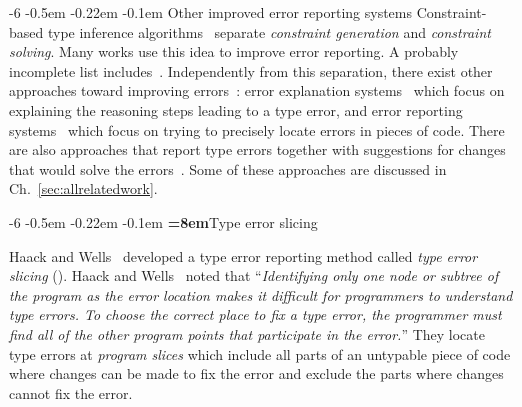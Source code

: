 \documentclass{jfp1}
\makeatletter
\def\subsection{\@startsection{subsection}{2}{\z@}{-0.2\baselineskip plus -0.1\baselineskip minus -0.1\baselineskip}%
    {-0.5em \@plus -0.22em \@minus -0.1em}{\normalfont\normalsize\bfseries}}%
\def\subsubsection{\@startsection{subsubsection}{3}{\z@}{-0.2\baselineskip plus -0.1\baselineskip minus -0.1\baselineskip}%
    {-0.5em \@plus -0.22em \@minus -0.1em}{\normalfont\normalsize\bfseries}}%
\newcommand{\sectiontitledot}[1]{#1.}
\renewcommand\subsection{\@startsection{subsection}{2}{\z@}%
                            {-6\p@ \@plus -1\p@ \@minus -1\p@}%
                            {-0.5em \@plus -0.22em \@minus -0.1em}%
                            {\normalfont\normalsize\bfseries\boldmath
                             \rightskip=\z@ \@plus 8em\pretolerance=10000\sectiontitledot}}
\renewcommand\subsubsection{\@startsection{subsubsection}{3}{\z@}%
                            {-6\p@ \@plus -1\p@ \@minus -1\p@}%
                            {-0.5em \@plus -0.22em \@minus -0.1em}%
                            {\normalfont\normalsize\bfseries\boldmath\sectiontitledot}}
\makeatother
\begin{document}
\subsubsection{Other improved error reporting systems}
%
Constraint-based type inference
algorithms~\cite{Odersky+Sulzmann+Wehr:1999,Pottier:2005,Pottier+Remy:2005}
separate \emph{constraint generation} and \emph{constraint solving}.
Many works use this idea to improve error reporting.  A probably
incomplete list
includes~\cite{Haack+Wells:2003,Haack+Wells:2004,Gast:2004,Heeren+Jeuring+Swierstra+Alcocer:2002,Heeren+Hage+Swierstra:2003a,Hage+Heeren:2005a,Heeren:2005,Hage+Heeren:2009,Stuckey+Sulzmann+Wazny:2003,Stuckey+Sulzmann+Wazny:2004,Stuckey+Sulzmann+Wazny:2006}.
%
Independently from this separation, there exist
other approaches toward improving
errors~\cite{Yang+Wells+Trinder+Michaelson:2000}: error explanation
systems~\cite{Beaven+Stansifer:1993,Duggan+Bent:1996,Duggan:1998,Yang+Michaelson+Trinder:2002}
which focus on explaining the reasoning steps leading to a type error,
and error reporting systems~\cite{Wand:1986,Tip+Dinesh:2001} which
focus on trying to precisely locate errors in pieces of code.
%
%
There are also approaches that report type errors together with
suggestions for changes that would solve the
errors~\cite{Hage+Heeren:2006,Chambers+Grossman+Flower+Lerner:2007}.
%
Some of these approaches are discussed in
Ch.~\ref{sec:allrelatedwork}.


\subsection{Type error slicing}


Haack and Wells~\cite{Haack+Wells:2004} developed a type error
reporting method called \emph{type error slicing} (\TES).
%
Haack and Wells~\cite{Haack+Wells:2004} noted that ``\emph{Identifying
  only one node or subtree of the program as the error location makes
  it difficult for programmers to understand type errors. To choose
  the correct place to fix a type error, the programmer must find all
  of the other program points that participate in the error.}''  They
locate type errors at \emph{program slices} which include all parts of
an untypable piece of code where changes can be made to fix the error
and exclude the parts where changes cannot fix the error.
\end{document}
